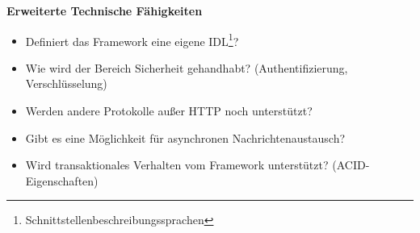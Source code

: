 \textbf{Erweiterte Technische Fähigkeiten}
\begin{itemize}
	\item Definiert das Framework eine eigene IDL\footnote{Schnittstellenbeschreibungssprachen}?
	\item Wie wird der Bereich Sicherheit gehandhabt?  (Authentifizierung, Verschlüsselung)
	\item Werden andere Protokolle außer HTTP noch unterstützt?
	\item Gibt es eine Möglichkeit für asynchronen Nachrichtenaustausch?
	\item Wird transaktionales Verhalten vom Framework unterstützt? (ACID-Eigenschaften)
\end{itemize}

